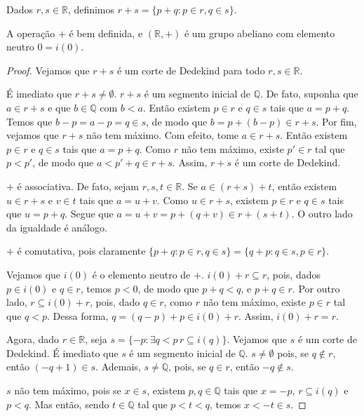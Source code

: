 \begin{definition}
    Dados $r, s \in \mathbb R$, definimos $r+s = \{p+q : p\in r, q\in s\}$.
\end{definition}
\begin{proposition}
    A operação $+$ é bem definida, e $(\mathbb R, +)$ é um grupo abeliano com elemento neutro $0 = i(0)$.
\end{proposition}
\begin{proof}
    Vejamos que $r+s$ é um corte de Dedekind para todo $r, s \in \mathbb R$.
    
    É imediato que $r+s\neq\emptyset$.
    $r+s$ é um segmento inicial de $\mathbb Q$.
    De fato, suponha que $a \in r+s$ e que $b\in\mathbb Q$ com $b<a$.
    Então existem $p\in r$ e $q\in s$ tais que $a=p+q$.
    Temos que $b-p=a-p=q\in s$, de modo que $b=p+(b-p)\in r+s$.
    Por fim, vejamos que $r+s$ não tem máximo.
    Com efeito, tome $a \in r+s$.
    Então existem $p\in r$ e $q\in s$ tais que $a=p+q$.
    Como $r$ não tem máximo, existe $p'\in r$ tal que $p<p'$, de modo que $a<p'+q\in r+s$.
    Assim, $r+s$ é um corte de Dedekind.

    $+$ é associativa.
    De fato, sejam $r, s, t \in \mathbb R$.
    Se $a \in (r+s)+t$, então existem $u \in r+s$ e $v \in t$ tais que $a=u+v$.
    Como $u \in r+s$, existem $p\in r$ e $q\in s$ tais que $u=p+q$.
    Segue que $a=u+v=p+(q+v)\in r+(s+t)$.
    O outro lado da igualdade é análogo.

    $+$ é comutativa, pois claramente $\{p+q : p\in r, q\in s\} = \{q+p : q\in s, p\in r\}$.

    Vejamos que $i(0)$ é o elemento neutro de $+$.
    $i(0)+r\subseteq r$, pois, dados $p\in i(0)$ e $q\in r$, temos $p<0$, de modo que $p+q<q$, e $p+q\in r$.
    Por outro lado, $r\subseteq i(0)+r$, pois, dado $q\in r$, como $r$ não tem máximo, existe $p\in r$ tal que $q<p$.
    Dessa forma, $q=(q-p)+p\in i(0)+r$.
    Assim, $i(0)+r=r$.

    Agora, dado $r \in \mathbb R$, seja $s=\{-p: \exists q<p\, r\subseteq i(q)\}$.
    Vejamos que $s$ é um corte de Dedekind.
    É imediato que $s$ é um segmento inicial de $\mathbb Q$.
    $s\neq \emptyset$ pois, se $q\notin r$, então $(-q+1)\in s$.
    Ademais, $s\neq \mathbb Q$, pois, se $q\in r$, então $-q\notin s$.

    $s$ não tem máximo, pois se $x \in s$, existem $p, q \in \mathbb Q$ tais que $x=-p$, $r\subseteq i(q)$ e $p<q$.
    Mas então, sendo $t \in \mathbb Q$ tal que $p<t<q$, temos $x<-t\in s$.


\end{proof}
